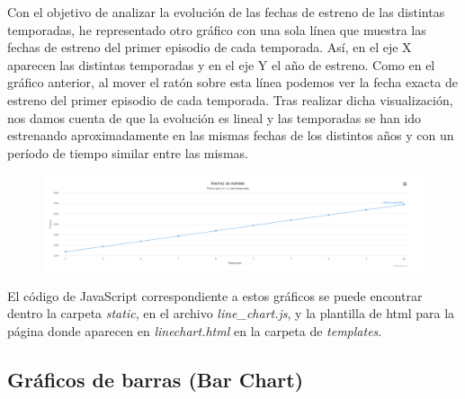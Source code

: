 \documentclass[12pt]{article}
\begin{document}
Con el objetivo de analizar la evolución de las fechas de estreno de las distintas temporadas, he representado otro gráfico con una sola línea que muestra las fechas de estreno del primer episodio de cada temporada. Así, en el eje X aparecen las distintas temporadas y en el eje Y el año de estreno. Como en el gráfico anterior, al mover el ratón sobre esta línea podemos ver la fecha exacta de estreno del primer episodio de cada temporada. Tras realizar dicha visualización, nos damos cuenta de que la evolución es lineal y las temporadas se han ido estrenando aproximadamente en las mismas fechas de los distintos años y con un período de tiempo similar entre las mismas. 

\begin{figure}[H]
	\centering
	\includegraphics[width=1.1\linewidth]{captura2}
	\caption{}
	\label{fig:captura2}
\end{figure}



 El código de JavaScript correspondiente a estos gráficos se puede encontrar dentro la carpeta \textit{static}, en el archivo \textit{line\_chart.js}, y la plantilla de html para la página donde aparecen en \textit{linechart.html} en la carpeta de \textit{templates}.
 
 \subsection{Gráficos de barras (Bar Chart)}
 
\end{document}
